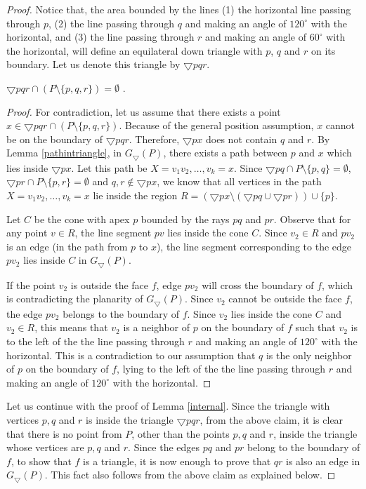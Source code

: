 \begin{proof}
Notice that, the area bounded by the lines (1) the horizontal line passing through $p$, (2) the line passing through $q$ and making an angle of 
$120 ^{\circ}$ with the horizontal, and (3) the line passing through $r$ and making an angle of $60 ^{\circ}$ with the horizontal, will define 
an equilateral down triangle with $p$, $q$ and $r$ on its boundary. Let us denote this triangle by $\bigtriangledown pqr$.
\begin{claim}
$\bigtriangledown pqr \cap (P\setminus \{p, q, r\}) =\emptyset$ .
\end{claim}
\begin{proof}
For contradiction, let us assume that there exists a point $x \in \bigtriangledown pqr \cap (P\setminus \{p, q, r\})$. 
Because of the general position assumption, $x$ cannot be on the boundary of $\bigtriangledown pqr$. Therefore, $\bigtriangledown px$ 
does not contain $q$ and $r$. By Lemma \ref{pathintriangle}, in $G_\bigtriangledown(P)$,
there exists a path between $p$ and $x$ which lies inside $\bigtriangledown px$. Let this path be $X=v_1 v_2, \ldots, v_k=x$. 
Since $\bigtriangledown pq \cap P \setminus \{p, q\} =\emptyset$, $\bigtriangledown pr \cap P \setminus \{p, r\}=\emptyset$ 
and $q, r \notin \bigtriangledown px$, we know that all vertices in the path $X=v_1 v_2, \ldots, v_k=x$ lie inside
the region $R = (\bigtriangledown px \setminus (\bigtriangledown pq \cup \bigtriangledown pr)) \cup \{p\}$. 

Let $C$ be the cone with apex $p$ bounded by the rays $pq$ and $pr$. Observe that for any point $v \in R$, the line segment
$pv$ lies inside the cone $C$. Since $v_2 \in R$ and $pv_2$ is an edge (in the path from $p$ to $x$), the line segment corresponding to the 
edge $pv_2$ lies inside $C$ in $G_\bigtriangledown(P)$. 

If the point $v_2$ is outside the face $f$, edge $pv_2$ will cross the boundary of $f$, which is contradicting
the planarity of $G_\bigtriangledown(P)$. Since $v_2$ cannot be outside the face $f$, the edge $pv_2$ belongs to the boundary of $f$. Since $v_2$ 
lies inside the cone $C$ and $v_2\in R$, this means that $v_2$ is a neighbor of $p$ on the boundary of $f$ such that $v_2$ is to the left of the the 
line passing through $r$ and making an angle of $120 ^{\circ}$ with the horizontal. This is a contradiction to our assumption that $q$ is the only 
neighbor of $p$ on the boundary of $f$, lying to the left of the the line passing through $r$ and making an angle of $120 ^{\circ}$ with the horizontal. 
\end{proof}
Let us continue with the proof of Lemma \ref{internal}. Since the triangle with vertices $p, q$ and $r$ is inside the triangle $\bigtriangledown pqr$, 
from the above claim, it is clear that
there is no point from $P$, other than the points $p, q$ and $r$, inside the triangle whose vertices are $p, q$ and $r$. Since the edges $pq$ and $pr$ 
belong to the boundary of $f$, to show that $f$ is a triangle, it is now enough to prove that $qr$ is also an edge in $G_\bigtriangledown(P)$. 
This fact 
also follows from the above claim as explained below.


\end{proof}
